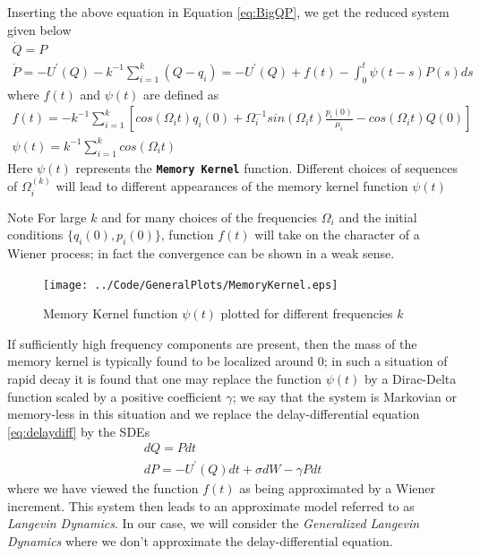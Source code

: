 \documentclass[a4paper,8pt]{beamer}
\begin{document}
	\begin{frame}
		Inserting the above equation in Equation \eqref{eq:BigQP}, we get the reduced system given below
		\begin{gather}
			\dot{Q} = P \\
			\dot{P} = -U^{'}(Q) - k^{-1} \sum_{i=1}^{k} (Q-q_{i}) = -U^{'}(Q) + f(t) - \int_{0}^{t} \psi (t-s)P(s)ds
			\label{eq:delaydiff}
		\end{gather}
		where $f(t)$ and $\psi(t)$ are defined as
		\begin{gather}
			f(t) = -k^{-1} \sum_{i=1}^{k} [ cos(\Omega_{i}t)q_{i}(0) + \Omega_{i}^{-1} sin(\Omega_{i}t)\frac{p_{i}(0)}{\mu_{i}} - cos(\Omega_{i}t)Q(0)] \\
			\psi(t) = k^{-1} \sum_{i=1}^{k} cos(\Omega_{i}t)
		\end{gather}
		Here $\psi(t)$ represents the \textbf{\texttt{Memory Kernel}} function. Different choices of sequences of $\Omega_{i}^{(k)}$ will lead to different appearances of the memory kernel function $\psi(t)$
		\begin{block}{Note}
			For large $k$ and for many choices of the frequencies $\Omega_{i}$ and the initial conditions $\{ q_{i}(0),p_{i}(0) \}$, function $f(t)$ will take on the character of a Wiener process; in fact the convergence can be shown in a weak sense.
		\end{block}
	\end{frame}

	\begin{frame}
		\begin{figure}[H]
			\texttt{[image: ../Code/GeneralPlots/MemoryKernel.eps]}
			\label{fig:memorykernel}
			\caption{Memory Kernel function $\psi(t)$ plotted for different frequencies $k$}
		\end{figure}
	\end{frame}

	\begin{frame}
		If sufficiently high frequency components are present, then the mass of the memory kernel is typically found to be localized around 0; in such a situation of rapid decay it is found that one may replace the function $\psi(t)$ by a Dirac-Delta function scaled by a positive coefficient $\gamma$; we say that the system is Markovian or memory-less in this situation and we replace the delay-differential equation \eqref{eq:delaydiff} by the SDEs
		\begin{gather}
			dQ = Pdt \\
			dP = -U^{'}(Q)dt + \sigma dW - \gamma P dt
		\end{gather}
		where we have viewed the function $f(t)$ as being approximated by a Wiener increment. This system then leads to an approximate model referred to as \emph{Langevin Dynamics}. In our case, we will consider the \emph{Generalized Langevin Dynamics} where we don't approximate the delay-differential equation.
	\end{frame}
\end{document}
